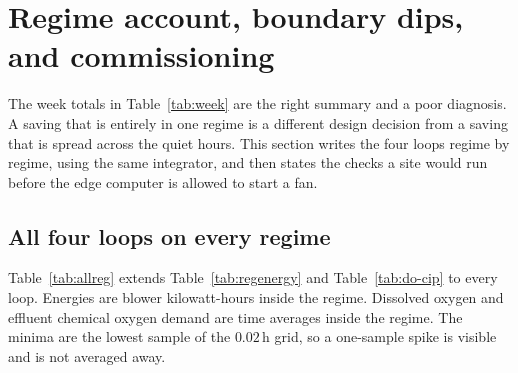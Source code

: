 \section{Regime account, boundary dips, and commissioning}
\label{sec:account}

The week totals in Table~\ref{tab:week} are the right summary and a poor diagnosis. A saving that is entirely in one regime is a different design decision from a saving that is spread across the quiet hours. This section writes the four loops regime by regime, using the same integrator, and then states the checks a site would run before the edge computer is allowed to start a fan.

\subsection{All four loops on every regime}

Table~\ref{tab:allreg} extends Table~\ref{tab:regenergy} and Table~\ref{tab:do-cip} to every loop. Energies are blower kilowatt-hours inside the regime. Dissolved oxygen and effluent chemical oxygen demand are time averages inside the regime. The minima are the lowest sample of the $0.02\,\mathrm{h}$ grid, so a one-sample spike is visible and is not averaged away.

